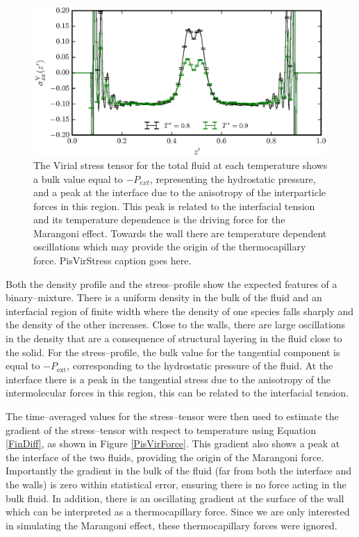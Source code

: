 \begin{figure}[h]
\centering
\includegraphics[scale=0.8]{PisVirStress}
\caption{The Virial stress tensor for the total fluid at each temperature shows a bulk value equal to $-P_{ext}$, representing the hydrostatic pressure, and a peak at the interface due to the anisotropy of the interparticle forces in this region.
This peak is related to the interfacial tension and its temperature dependence is the driving force for the Marangoni effect.
Towards the wall there are temperature dependent oscillations which may provide the origin of the thermocapillary force.
PisVirStress caption goes here.}
\label{PisVirStress}
\end{figure}

Both the density profile and the stress--profile show the expected features of a binary--mixture. 
There is a uniform density in the bulk of the fluid and an interfacial region of finite width where the density of one species falls sharply and the density of the other increases.
Close to the walls, there are large oscillations in the density that are a consequence of structural layering in the fluid close to the solid.
For the stress--profile, the bulk value for the tangential component is equal to $-P_{\mathrm{ext}}$, corresponding to the hydrostatic pressure of the fluid.
At the interface there is a peak in the tangential stress due to the anisotropy of the intermolecular forces in this region, this can be related to the interfacial tension.\cite{Marchand2011}

The time--averaged values for the stress--tensor were then used to estimate the gradient of the stress--tensor with respect to temperature using Equation \ref{FinDiff}, as shown in Figure \ref{PisVirForce}.
This gradient also shows a peak at the interface of the two fluids, providing the origin of the Marangoni force.
Importantly the gradient in the bulk of the fluid (far from both the interface and the walls) is zero within statistical error, ensuring there is no force acting in the bulk fluid.
In addition, there is an oscillating gradient at the surface of the wall which can be interpreted as a thermocapillary force.
Since we are only interested in simulating the Marangoni effect, these thermocapillary forces were ignored.

